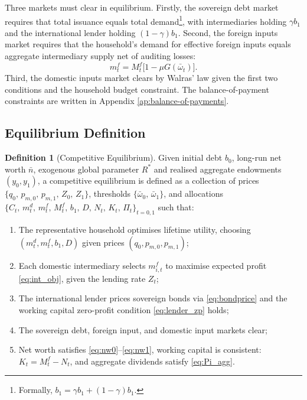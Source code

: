 \documentclass[11pt]{article}
\theoremstyle{definition}
\newtheorem{definition}{Definition}
\theoremstyle{plain}
\theoremstyle{remark}
\newcommand{\mf}{m^{f}}
\newcommand{\md}{m^{d}}
\newcommand{\Mf}{M^{f}}
\begin{document}
Three markets must clear in equilibrium. Firstly, the sovereign debt market requires that total issuance equals total demand\footnote{Formally, $b_1 = \gamma b_1 + (1-\gamma)b_1$.}, with intermediaries holding $\gamma b_1$ and the international lender holding $(1-\gamma)b_1$. Second, the foreign inputs market requires that the household's demand for effective foreign inputs equals aggregate intermediary supply net of auditing losses:
\begin{equation}\label{eq:mc_foreign}
\mf_t = \Mf_t\bigl[1 - \mu G(\bar{\omega}_t)\bigr].
\end{equation}
Third, the domestic inputs market clears by Walras' law given the first two conditions and the household budget constraint. The balance-of-payment constraints are written in Appendix \ref{ap:balance-of-payments}.

\subsection{Equilibrium Definition}

\begin{definition}[Competitive Equilibrium]\label{def:equil}
Given initial debt $b_0$, long-run net worth $\bar{n}$, exogenous global parameter $R^*$ and realised aggregate endowments $(y_0, y_1)$, a competitive equilibrium is defined as a collection of prices $\{q_0,\, p_{m,0},\, p_{m,1},\, Z_0,\, Z_1\}$, thresholds $\{\bar{\omega}_0,\, \bar{\omega}_1\}$, and allocations $\{C_t,\, \md_t,\, \mf_t,\, \Mf_t,\, b_1,\, D,\, N_t,\, K_t,\, \Pi_t\}_{t=0,1}$ such that:
\begin{enumerate}[label=(\roman*)]
\item The representative household optimises lifetime utility, choosing $(\md_t, \mf_t, b_1, D)$ given prices $(q_0, p_{m,0}, p_{m,1})$;
\item Each domestic intermediary selects $\mf_{i,t}$ to maximise expected profit \eqref{eq:int_obj}, given the lending rate $Z_t$;
\item The international lender prices sovereign bonds via \eqref{eq:bondprice} and the working capital zero-profit condition \eqref{eq:lender_zp} holds; %
\item The sovereign debt, foreign input, and domestic input markets clear;
\item Net worth satisfies \eqref{eq:nw0}--\eqref{eq:nw1}, working capital is consistent: $K_t =  \Mf_t - N_t$, and aggregate dividends satisfy \eqref{eq:Pi_agg}. %
\end{enumerate}
\end{definition}
\end{document}
